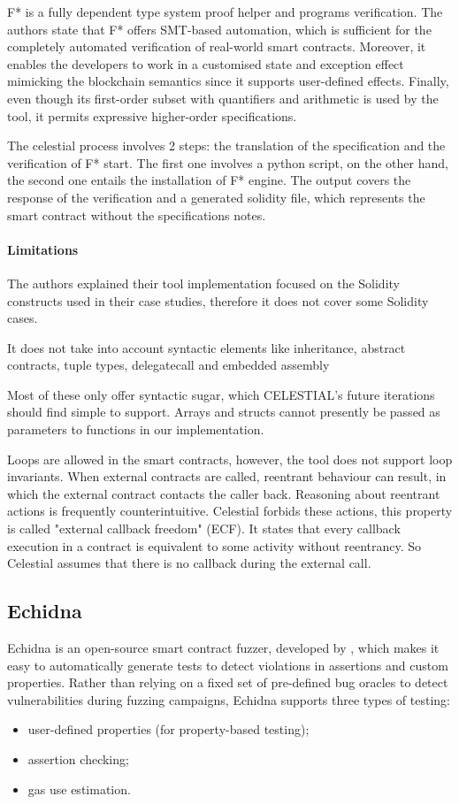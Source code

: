 F* is a fully dependent type system proof helper and programs verification. 
The authors state that F* offers SMT-based automation, which is sufficient for the completely automated verification of real-world smart contracts. 
Moreover, it enables the developers to work in a customised state and exception effect mimicking the blockchain semantics since it supports user-defined effects. 
Finally, even though its first-order subset with quantifiers and arithmetic is used by the tool, it permits expressive higher-order specifications.

The celestial process involves 2 steps: the translation of the specification and the verification of F* start. 
The first one involves a python script, on the other hand, the second one entails the installation of F* engine. 
The output covers the response of the verification and a generated solidity file, which represents the smart contract without the specifications notes. 

\paragraph{Limitations} 
The authors explained their tool implementation focused on the Solidity constructs used in their case studies, therefore it does not cover some Solidity cases. 

It does not take into account syntactic elements like inheritance, abstract contracts, tuple types, delegatecall and  embedded assembly

Most of these only offer syntactic sugar, which CELESTIAL's future iterations should find simple to support.
Arrays and structs cannot presently be passed as parameters to functions in our implementation. 

Loops are allowed in the smart contracts, however, the tool does not support loop invariants.
When external contracts are called, reentrant behaviour can result, in which the external contract contacts the caller back.
Reasoning about reentrant actions is frequently counterintuitive.
Celestial forbids these actions, this property is called "external callback freedom" (ECF). It states that every callback execution 
in a contract is equivalent to some activity without reentrancy.
So Celestial assumes that there is no callback during the external call.

\subsection{Echidna}
\label{sec:Specification:Echidna}
Echidna is an open-source smart contract fuzzer, developed by \citet{Echidna}, which makes it easy to automatically generate tests to detect violations in
assertions and custom properties.
Rather than relying on a fixed set of pre-defined bug oracles to detect vulnerabilities
during fuzzing campaigns, Echidna supports three types of testing: 
\begin{itemize}
    \item user-defined properties (for property-based testing);
    \item assertion checking;
    \item gas use estimation.
\end{itemize}

